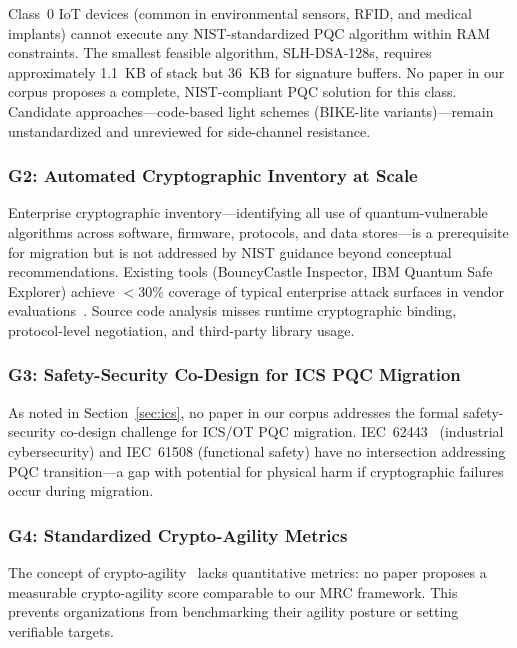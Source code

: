 \documentclass[journal]{IEEEtran}
\begin{document}
Class~0 IoT devices (common in environmental sensors, RFID, and medical
implants) cannot execute any NIST-standardized PQC algorithm within RAM
constraints. The smallest feasible algorithm, SLH-DSA-128s, requires
approximately 1.1~KB of stack but 36~KB for signature buffers. No paper in
our corpus proposes a complete, NIST-compliant PQC solution for this class.
Candidate approaches---code-based light schemes (BIKE-lite variants)---remain
unstandardized and unreviewed for side-channel resistance.

\subsubsection{G2: Automated Cryptographic Inventory at Scale}

Enterprise cryptographic inventory---identifying all use of quantum-vulnerable
algorithms across software, firmware, protocols, and data stores---is a
prerequisite for migration but is not addressed by NIST guidance beyond
conceptual recommendations. Existing tools (BouncyCastle Inspector, IBM
Quantum Safe Explorer) achieve $<$30\% coverage of typical enterprise attack
surfaces in vendor evaluations~\cite{xiao2023machine}. Source code analysis
misses runtime cryptographic binding, protocol-level negotiation, and
third-party library usage.

\subsubsection{G3: Safety-Security Co-Design for ICS PQC Migration}

As noted in Section~\ref{sec:ics}, no paper in our corpus addresses the formal
safety-security co-design challenge for ICS/OT PQC migration. IEC~62443~\cite{iec62443}
(industrial cybersecurity) and IEC~61508 (functional safety) have no
intersection addressing PQC transition---a gap with potential for physical harm
if cryptographic failures occur during migration.

\subsubsection{G4: Standardized Crypto-Agility Metrics}

The concept of crypto-agility~\cite{hoffman2022cryptoagility} lacks
quantitative metrics: no paper proposes a measurable crypto-agility score
comparable to our MRC framework. This prevents organizations from benchmarking
their agility posture or setting verifiable targets.
\end{document}
